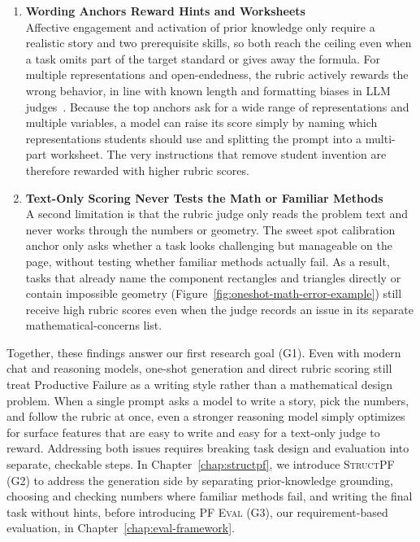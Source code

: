 \begin{enumerate}[leftmargin=0.6cm,label=\textbf{\arabic*.},itemsep=0.6em,topsep=0.4em]
    \item \textbf{Wording Anchors Reward Hints and Worksheets}\\[0.2em]
    Affective engagement and activation of prior knowledge only require a realistic story and two prerequisite skills, so both reach the ceiling even when a task omits part of the target standard or gives away the formula. For multiple representations and open-endedness, the rubric actively rewards the wrong behavior, in line with known length and formatting biases in LLM judges~\cite{zheng2023judging,wang2024fairevaluators}. Because the top anchors ask for a wide range of representations and multiple variables, a model can raise its score simply by naming which representations students should use and splitting the prompt into a multi-part worksheet. The very instructions that remove student invention are therefore rewarded with higher rubric scores.

    \item \textbf{Text-Only Scoring Never Tests the Math or Familiar Methods}\\[0.2em]
    A second limitation is that the rubric judge only reads the problem text and never works through the numbers or geometry. The sweet spot calibration anchor only asks whether a task looks challenging but manageable on the page, without testing whether familiar methods actually fail. As a result, tasks that already name the component rectangles and triangles directly or contain impossible geometry (Figure~\ref{fig:oneshot-math-error-example}) still receive high rubric scores even when the judge records an issue in its separate mathematical-concerns list.
\end{enumerate}

Together, these findings answer our first research goal (G1). Even with modern chat and reasoning models, one-shot generation and direct rubric scoring still treat Productive Failure as a writing style rather than a mathematical design problem. When a single prompt asks a model to write a story, pick the numbers, and follow the rubric at once, even a stronger reasoning model simply optimizes for surface features that are easy to write and easy for a text-only judge to reward. Addressing both issues requires breaking task design and evaluation into separate, checkable steps. In Chapter~\ref{chap:structpf}, we introduce \textsc{StructPF} (G2) to address the generation side by separating prior-knowledge grounding, choosing and checking numbers where familiar methods fail, and writing the final task without hints, before introducing \textsc{PF Eval} (G3), our requirement-based evaluation, in Chapter~\ref{chap:eval-framework}.
